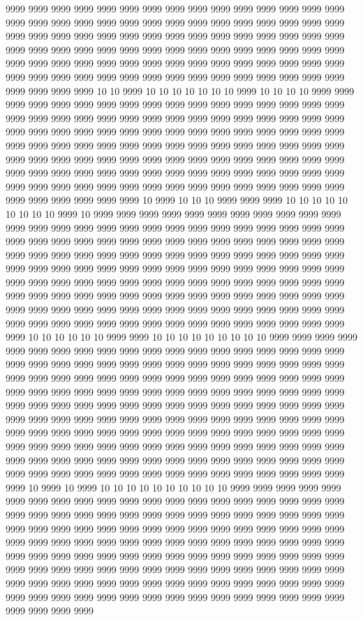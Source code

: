 9999 9999 9999 9999 9999 9999 9999 9999 9999 9999 9999 9999 9999 9999 9999 9999 9999 9999 9999 9999 9999 9999 9999 9999 9999 9999 9999 9999 9999 9999 9999 9999 9999 9999 9999 9999 9999 9999 9999 9999 9999 9999 9999 9999 9999 9999 9999 9999 9999 9999 9999 9999 9999 9999 9999 9999 9999 9999 9999 9999 9999 9999 9999 9999 9999 9999 9999 9999 9999 9999 9999 9999 9999 9999 9999 9999 9999 9999 9999 9999 9999 9999 9999 9999 9999 9999 9999 9999 9999 9999 9999 9999 9999 9999 10 10 9999 10 10 10 10 10 10 10 9999 10 10 10 10 9999 9999 9999 9999 9999 9999 9999 9999 9999 9999 9999 9999 9999 9999 9999 9999 9999 9999 9999 9999 9999 9999 9999 9999 9999 9999 9999 9999 9999 9999 9999 9999 9999 9999 9999 9999 9999 9999 9999 9999 9999 9999 9999 9999 9999 9999 9999 9999 9999 9999 9999 9999 9999 9999 9999 9999 9999 9999 9999 9999 9999 9999 9999 9999 9999 9999 9999 9999 9999 9999 9999 9999 9999 9999 9999 9999 9999 9999 9999 9999 9999 9999 9999 9999 9999 9999 9999 9999 9999 9999 9999 9999 9999 9999 9999 9999 9999 9999 9999 9999 9999 9999 9999 9999 9999 9999 9999 9999 9999 9999 9999 9999 9999 10 9999 10 10 10 9999 9999 9999 10 10 10 10 10 10 10 10 10 9999 10 9999 9999 9999 9999 9999 9999 9999 9999 9999 9999 9999 9999 9999 9999 9999 9999 9999 9999 9999 9999 9999 9999 9999 9999 9999 9999 9999 9999 9999 9999 9999 9999 9999 9999 9999 9999 9999 9999 9999 9999 9999 9999 9999 9999 9999 9999 9999 9999 9999 9999 9999 9999 9999 9999 9999 9999 9999 9999 9999 9999 9999 9999 9999 9999 9999 9999 9999 9999 9999 9999 9999 9999 9999 9999 9999 9999 9999 9999 9999 9999 9999 9999 9999 9999 9999 9999 9999 9999 9999 9999 9999 9999 9999 9999 9999 9999 9999 9999 9999 9999 9999 9999 9999 9999 9999 9999 9999 9999 9999 9999 9999 9999 9999 9999 9999 9999 9999 9999 9999 9999 9999 9999 9999 9999 9999 9999 9999 9999 9999 9999 9999 9999 10 10 10 10 10 10 9999 9999 10 10 10 10 10 10 10 10 10 9999 9999 9999 9999 9999 9999 9999 9999 9999 9999 9999 9999 9999 9999 9999 9999 9999 9999 9999 9999 9999 9999 9999 9999 9999 9999 9999 9999 9999 9999 9999 9999 9999 9999 9999 9999 9999 9999 9999 9999 9999 9999 9999 9999 9999 9999 9999 9999 9999 9999 9999 9999 9999 9999 9999 9999 9999 9999 9999 9999 9999 9999 9999 9999 9999 9999 9999 9999 9999 9999 9999 9999 9999 9999 9999 9999 9999 9999 9999 9999 9999 9999 9999 9999 9999 9999 9999 9999 9999 9999 9999 9999 9999 9999 9999 9999 9999 9999 9999 9999 9999 9999 9999 9999 9999 9999 9999 9999 9999 9999 9999 9999 9999 9999 9999 9999 9999 9999 9999 9999 9999 9999 9999 9999 9999 9999 9999 9999 9999 9999 9999 9999 9999 9999 9999 9999 9999 9999 9999 9999 9999 9999 9999 9999 9999 9999 9999 9999 9999 9999 9999 9999 9999 9999 9999 10 9999 10 9999 10 10 10 10 10 10 10 10 10 10 9999 9999 9999 9999 9999 9999 9999 9999 9999 9999 9999 9999 9999 9999 9999 9999 9999 9999 9999 9999 9999 9999 9999 9999 9999 9999 9999 9999 9999 9999 9999 9999 9999 9999 9999 9999 9999 9999 9999 9999 9999 9999 9999 9999 9999 9999 9999 9999 9999 9999 9999 9999 9999 9999 9999 9999 9999 9999 9999 9999 9999 9999 9999 9999 9999 9999 9999 9999 9999 9999 9999 9999 9999 9999 9999 9999 9999 9999 9999 9999 9999 9999 9999 9999 9999 9999 9999 9999 9999 9999 9999 9999 9999 9999 9999 9999 9999 9999 9999 9999 9999 9999 9999 9999 9999 9999 9999 9999 9999 9999 9999 9999 9999 9999 9999 9999 9999 9999 9999 9999 9999 9999 9999 9999 9999 9999 9999 9999 9999 